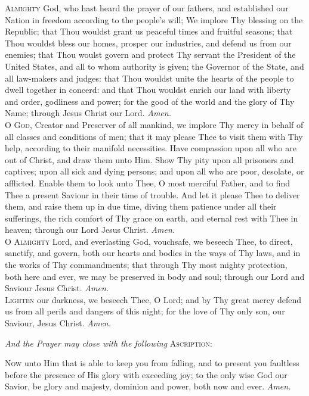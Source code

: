 \noindent\lettrine{A}{lmighty} God, who hast heard the prayer of our fathers, and established our Nation in freedom according to the people's will; We implore Thy blessing on the Republic; that Thou wouldst grant us peaceful times and fruitful seasons; that Thou wouldst bless our homes, prosper our industries, and defend us from our enemies; that Thou woulst govern and protect Thy servant the President of the United States, and all to whom authority is given; the Governor of the State, and all law-makers and judges: that Thou wouldst unite the hearts of the people to dwell together in concerd: and that Thou wouldst enrich our land with liberty and order, godliness and power; for the good of the world and the glory of Thy Name; through Jesus Christ our Lord. \textit{Amen.} \\

\noindent\lettrine{O}{ God,} Creator and Preserver of all mankind, we implore Thy mercy in behalf of all classes and conditions of men; that it may please Thee to visit them with Thy help, according to their manifold necessities.
Have compassion upon all who are out of Christ, and draw them unto Him.
Show Thy pity upon all prisoners and captives; upon all sick and dying persons; and upon all who are poor, desolate, or afflicted.
Enable them to look unto Thee, O most merciful Father, and to find Thee a present Saviour in their time of trouble.
And let it please Thee to deliver them, and raise them up in due time, diving them patience under all their sufferings, the rich comfort of Thy grace on earth, and eternal rest with Thee in heaven; through our Lord Jesus Christ. \textit{Amen.} \\

\noindent\lettrine{O}{ Almighty} Lord, and everlasting God, vouchsafe, we beseech Thee, to direct, sanctify, and govern, both our hearts and bodies in the ways of Thy laws, and in the works of Thy commandments; that through Thy most mighty protection, both here and ever, we may be preserved in body and soul; through our Lord and Saviour Jesus Christ. \textit{Amen.} \\

\noindent\lettrine{L}{ighten} our darkness, we beseech Thee, O Lord; and by Thy great mercy defend us from all perils and dangers of this night; for the love of Thy only son, our Saviour, Jesus Christ. \textit{Amen.} \\

{\centering \textit{And the Prayer may close with the following} \textsc{Ascription:} \par}
\vspace{1ex}
\noindent\lettrine{N}{ow} unto Him that is able to keep you from falling, and to present you faultless before the presence of His glory with exceeding joy; to the only wise God our Savior, be glory and majesty, dominion and power, both now and ever. \textit{Amen.}

